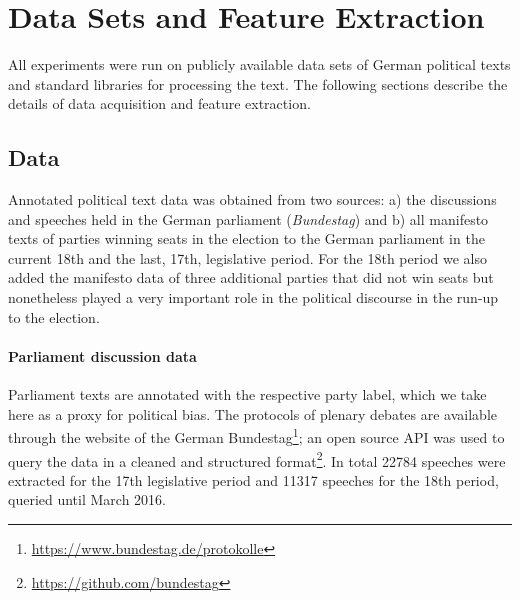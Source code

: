 \documentclass{article}
\begin{document}
\section{Data Sets and Feature Extraction}\label{sec:data}
%
All experiments were run on publicly available data sets of German political texts and standard libraries for processing the text. The following sections describe the details of data acquisition and feature extraction.

\subsection{Data}
Annotated political text data was obtained from two sources: a) the discussions and speeches held in the German parliament ({\em Bundestag}) and b) all manifesto texts of parties winning seats in the election to the German parliament in the current 18th and the last, 17th, legislative period. For the 18th period we also added the manifesto data of three additional parties that did not win seats but nonetheless played a very important role in the political discourse in the run-up to the election.

\paragraph{Parliament discussion data} Parliament texts are annotated with the respective party label, which we take here as a proxy for political bias. The protocols of plenary debates are available through the website of the German Bundestag\footnote{\url{https://www.bundestag.de/protokolle}}; an open source API was used to query the data in a cleaned and structured format\footnote{\url{https://github.com/bundestag}}. In total 22784 speeches were extracted for the 17th legislative period and 11317 speeches for the 18th period, queried until March 2016.
\end{document}
